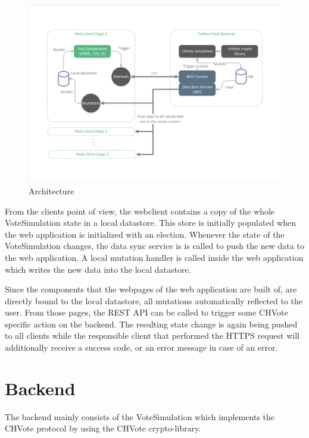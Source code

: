 \begin{figure}[h!]
\begin{center}
\includegraphics[scale=0.62]{assets/architecture.pdf}
\caption{Architecture}
\end{center}
\end{figure}

From the clients point of view, the webclient contains a copy of the whole VoteSimulation state in a local datastore. This store is initially populated when the web application is initialized with an election. Whenever the state of the VoteSimulation changes, the data sync service is is called to push the new data to the web application. A local mutation handler is called inside the web application which writes the new data into the local datastore.

Since the components that the webpages of the web application are built of, are directly bound to the local datastore, all mutations automatically reflected to the user. From those pages, the REST API can be called to trigger some CHVote specific action on the backend. The resulting state change is again being pushed to all clients while the responsible client that performed the HTTPS request will additionally receive a success code, or an error message in case of an error.

\section{Backend}
The backend mainly consists of the VoteSimulation which implements the CHVote protocol by using the CHVote crypto-library. 
